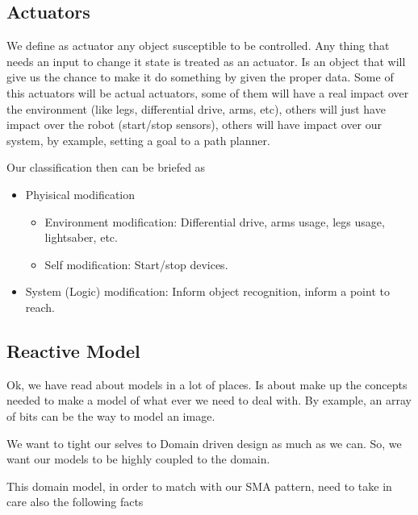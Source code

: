 \documentclass[a4paper,10pt,twoside]{book}
\begin{document}
					
					
					
					
					\subsection {Actuators}
					
					We define as actuator any object susceptible to be controlled. Any thing that needs an input to change it state is treated as an actuator. Is an object that will give us the chance to make it do something by given the proper data.
					Some of this actuators will be actual actuators, some of them will have a real impact over the environment (like legs, differential drive, arms, etc), others will just have impact over the robot (start/stop sensors), others will have impact over our system, by example, setting a goal to a path planner.
					
					
					Our classification then can be briefed as
					
					\begin{itemize}
						\item Phyisical modification \begin{itemize}
								\item Environment modification: Differential drive, arms usage, legs usage, lightsaber, etc. 
								\item Self modification: Start/stop devices.
							\end{itemize}
						\item System (Logic) modification: Inform object recognition, inform a point to reach.
					\end{itemize}

				
					
			
					
					
					\subsection{ Reactive Model } 
					
						Ok, we have read about models in a lot of places. Is about make up the concepts needed to make a model of what ever we need to deal with. By example, an array of bits can be the way to model an image. 
						
						We want to tight our selves to Domain driven design as much as we can. So, we want our models to be highly coupled to the domain. 
						
						This domain model, in order to match with our SMA pattern, need to take in care also the following facts
						
\end{document}
